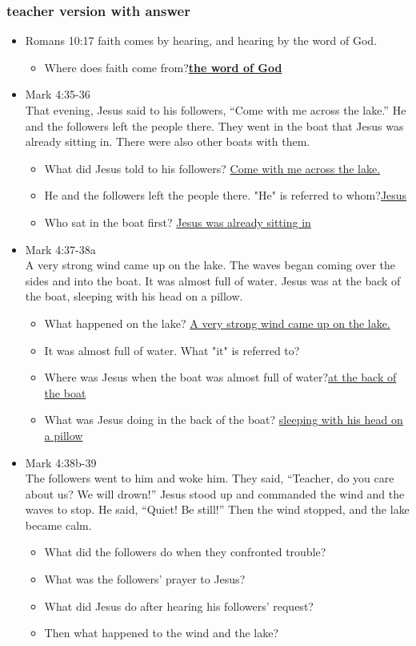 \subsubsection{teacher version with answer}
\large
\begin{itemize}
\item Romans 10:17 faith comes by hearing, and hearing by the word of God.
\begin{itemize}
\item Where does faith come from?\underline{\textbf{the word of God}}
\end{itemize}

\item Mark 4:35-36\\
That evening, Jesus said to his followers, “Come with me across the lake.” He and the followers left the people there. They went in the boat that Jesus was already sitting in. There were also other boats with them. 
\begin{itemize}
\item What did Jesus told to his followers? \underline{Come with me across the lake.}
\item He and the followers left the people there. "He" is referred to whom?\underline{Jesus}
\item Who sat in the boat first? \underline{Jesus was already sitting in}
\end{itemize}


\item Mark 4:37-38a\\ A very strong wind came up on the lake. The waves began coming over the sides and into the boat. It was almost full of water. Jesus was at the back of the boat, sleeping with his head on a pillow. 
\begin{itemize}
\item What happened on the lake? \underline{A very strong wind came up on the lake.}
\item It was almost full of water.  What "it" is referred to?
\item Where was Jesus when the boat was almost full of water?\underline{at the back of the boat}
\item What was Jesus doing in the back of the boat? \underline{sleeping with his head on a pillow}
\end{itemize}


\item Mark 4:38b-39\\The followers went to him and woke him. They said, “Teacher, do you care about us? We will drown!” Jesus stood up and commanded the wind and the waves to stop. He said, “Quiet! Be still!” Then the wind stopped, and the lake became calm.
\begin{itemize}
\item What did the followers do when they confronted trouble? 
\item What was the followers' prayer to Jesus?
\item What did Jesus do after hearing his followers' request?
\item Then what happened to the wind and the lake?
\end{itemize}


\end{itemize}
